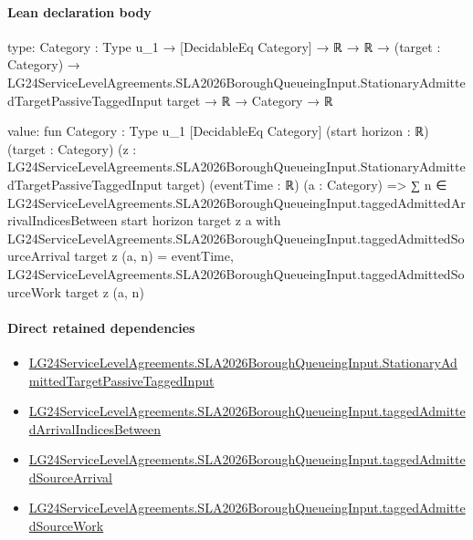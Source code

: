 \documentclass[10pt]{article}
\begin{document}
\paragraph{Lean declaration body}
\begin{ReviewVerbatim}
type:
{Category : Type u_1} →
  [DecidableEq Category] →
    ℝ →
      ℝ →
        (target : Category) →
          LG24ServiceLevelAgreements.SLA2026BoroughQueueingInput.StationaryAdmittedTargetPassiveTaggedInput target →
            ℝ → Category → ℝ

value:
fun {Category : Type u_1} [DecidableEq Category] (start horizon : ℝ) (target : Category)
    (z : LG24ServiceLevelAgreements.SLA2026BoroughQueueingInput.StationaryAdmittedTargetPassiveTaggedInput target)
    (eventTime : ℝ) (a : Category) =>
  ∑
    n ∈
      LG24ServiceLevelAgreements.SLA2026BoroughQueueingInput.taggedAdmittedArrivalIndicesBetween start horizon target z
        a with
    LG24ServiceLevelAgreements.SLA2026BoroughQueueingInput.taggedAdmittedSourceArrival target z (a, n) = eventTime,
    LG24ServiceLevelAgreements.SLA2026BoroughQueueingInput.taggedAdmittedSourceWork target z (a, n)
\end{ReviewVerbatim}

\paragraph{Direct retained dependencies}
\begin{itemize}\raggedright
\item \hyperlink{governing-declaration-8796a25a610eaea9}{LG24\allowbreak{}Service\allowbreak{}Level\allowbreak{}Agreements.\allowbreak{}SLA2026\allowbreak{}Borough\allowbreak{}Queueing\allowbreak{}Input.\allowbreak{}Stationary\allowbreak{}Admitted\allowbreak{}Target\allowbreak{}Passive\allowbreak{}Tagged\allowbreak{}Input}
\item \hyperlink{governing-declaration-829935ff80d7c57f}{LG24\allowbreak{}Service\allowbreak{}Level\allowbreak{}Agreements.\allowbreak{}SLA2026\allowbreak{}Borough\allowbreak{}Queueing\allowbreak{}Input.\allowbreak{}tagged\allowbreak{}Admitted\allowbreak{}Arrival\allowbreak{}Indices\allowbreak{}Between}
\item \hyperlink{governing-declaration-a59c070f06d8e776}{LG24\allowbreak{}Service\allowbreak{}Level\allowbreak{}Agreements.\allowbreak{}SLA2026\allowbreak{}Borough\allowbreak{}Queueing\allowbreak{}Input.\allowbreak{}tagged\allowbreak{}Admitted\allowbreak{}Source\allowbreak{}Arrival}
\item \hyperlink{governing-declaration-15319024241977b5}{LG24\allowbreak{}Service\allowbreak{}Level\allowbreak{}Agreements.\allowbreak{}SLA2026\allowbreak{}Borough\allowbreak{}Queueing\allowbreak{}Input.\allowbreak{}tagged\allowbreak{}Admitted\allowbreak{}Source\allowbreak{}Work}
\end{itemize}
\hypertarget{governing-declaration-0504533524bddb14}{}
\end{document}
